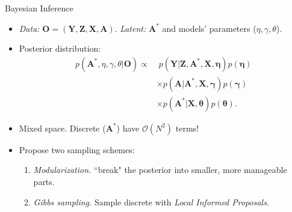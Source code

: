 \documentclass{beamer}
\def \bZ {\textbf{Z}}
\def \bA {\textbf{A}}
\def \bX {\textbf{X}}
\def \bY {\textbf{Y}}
\def \bO {\textbf{O}}
\def \boeta {\boldsymbol{\eta}}
\def \bgamma {\boldsymbol{\gamma}}
\def \btheta {\boldsymbol{\theta}}
\begin{document}
    \begin{frame}{Bayesian Inference}
        \large
        \begin{itemize}
            \item<1-> \emph{Data:} $\bO = (\bY,\bZ,\bX,\bA)$. \emph{Latent:} $\bA^\ast$
            and models' parameters ($\eta,\gamma,\theta$).
            \vspace{0.2cm}
            \item<2-> Posterior distribution:
            \begin{equation*}
                \begin{split}
                    p(\bA^\ast, \eta,\gamma,\theta \vert \bO) 
                        \propto
                    &\;
                    p(\bY \vert \bZ,\bA^\ast,\bX,\boeta) p(\boeta) 
                    \\ & \times
                    p(\bA \vert \bA^\ast, \bX,\bgamma) p(\bgamma)
                    \\ & \times 
                    p(\bA^\ast \vert \bX,\btheta) p(\btheta).
                \end{split}
            \end{equation*} 
            \item<3-> Mixed space. Discrete ($\bA^\ast$) have $\mathcal{O}(N^2)$ terms!
            \vspace{0.2cm}
            \item<4-> Propose two sampling schemes:
            \normalsize
            \begin{enumerate}
                \item \emph{Modularization.} ``break" the posterior into smaller, more manageable parts.
                \vspace{0.1cm}
                \item \emph{Gibbs sampling.} Sample discrete with \emph{Local Informed Proposals}.
            \end{enumerate} 
        \end{itemize}
    \end{frame}
\end{document}
